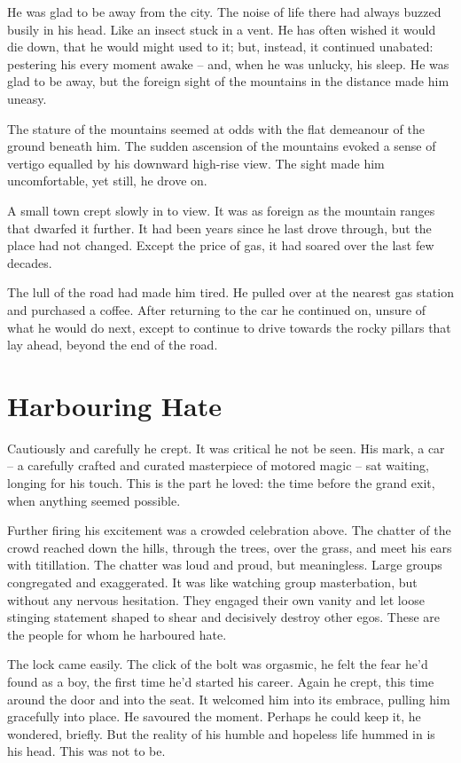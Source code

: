 \documentclass[fontsize=12pt,english]{scrreprt}
\begin{document}
He was glad to be away from the city. The noise of life there had
always buzzed busily in his head. Like an insect stuck in a vent. He
has often wished it would die down, that he would might used to it;
but, instead, it continued unabated: pestering his every moment awake
-- and, when he was unlucky, his sleep. He was glad to be away, but
the foreign sight of the mountains in the distance made him uneasy.

The stature of the mountains seemed at odds with the flat demeanour of
the ground beneath him. The sudden ascension of the mountains evoked a
sense of vertigo equalled by his downward high-rise view. The sight
made him uncomfortable, yet still, he drove on.

A small town crept slowly in to view. It was as foreign as the
mountain ranges that dwarfed it further. It had been years since he
last drove through, but the place had not changed. Except the price of
gas, it had soared over the last few decades.

The lull of the road had made him tired. He pulled over at the nearest
gas station and purchased a coffee. After returning to the car he
continued on, unsure of what he would do next, except to continue to
drive towards the rocky pillars that lay ahead, beyond the end of the
road.

\newpage

\section{Harbouring Hate}

Cautiously and carefully he crept. It was critical he not be seen. His
mark, a car -- a carefully crafted and curated masterpiece of motored
magic -- sat waiting, longing for his touch. This is the part he
loved: the time before the grand exit, when anything seemed
possible.

Further firing his excitement was a crowded celebration above. The
chatter of the crowd reached down the hills, through the trees, over
the grass, and meet his ears with titillation. The chatter was loud
and proud, but meaningless. Large groups congregated and
exaggerated. It was like watching group masterbation, but without any
nervous hesitation. They engaged their own vanity and let loose
stinging statement shaped to shear and decisively destroy other
egos. These are the people for whom he harboured hate.

The lock came easily. The click of the bolt was orgasmic, he felt the
fear he'd found as a boy, the first time he'd started his
career. Again he crept, this time around the door and into the
seat. It welcomed him into its embrace, pulling him gracefully into
place. He savoured the moment. Perhaps he could keep it, he wondered,
briefly. But the reality of his humble and hopeless life hummed in is
his head. This was not to be.
\end{document}
